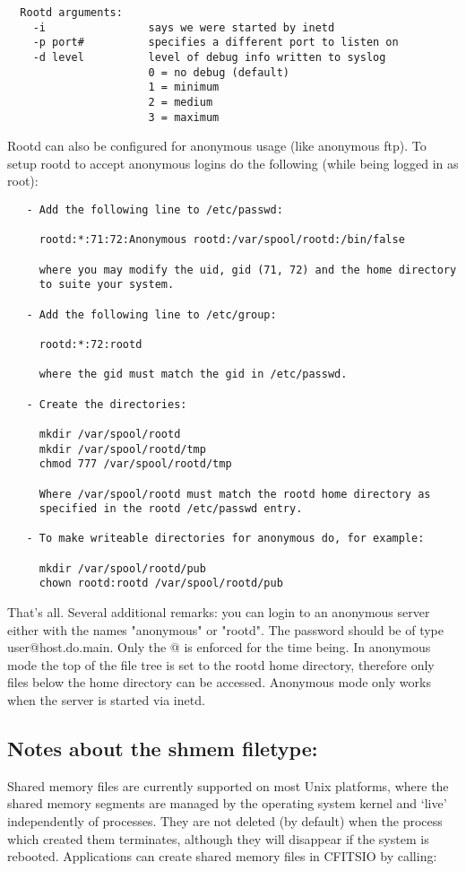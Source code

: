 \documentclass[11pt]{book}
\begin{document}
\begin{verbatim}
  Rootd arguments:
    -i                says we were started by inetd
    -p port#          specifies a different port to listen on
    -d level          level of debug info written to syslog
                      0 = no debug (default)
                      1 = minimum
                      2 = medium
                      3 = maximum
\end{verbatim}
Rootd can also be configured for anonymous usage (like anonymous ftp).
To setup rootd to accept anonymous logins do the following (while being
logged in as root):

\begin{verbatim}
   - Add the following line to /etc/passwd:

     rootd:*:71:72:Anonymous rootd:/var/spool/rootd:/bin/false

     where you may modify the uid, gid (71, 72) and the home directory
     to suite your system.

   - Add the following line to /etc/group:

     rootd:*:72:rootd

     where the gid must match the gid in /etc/passwd.

   - Create the directories:

     mkdir /var/spool/rootd
     mkdir /var/spool/rootd/tmp
     chmod 777 /var/spool/rootd/tmp

     Where /var/spool/rootd must match the rootd home directory as
     specified in the rootd /etc/passwd entry.

   - To make writeable directories for anonymous do, for example:

     mkdir /var/spool/rootd/pub
     chown rootd:rootd /var/spool/rootd/pub
\end{verbatim}
That's all.  Several additional remarks:  you can login to an anonymous
server either with the names "anonymous" or "rootd".  The password should
be of type user@host.do.main. Only the @ is enforced for the time
being.  In anonymous mode the top of the file tree is set to the rootd
home directory, therefore only files below the home directory can be
accessed.  Anonymous mode only works when the server is started via
inetd.


\subsection{Notes about the shmem filetype:}

Shared memory files are currently supported on most Unix platforms,
where the shared memory segments are managed by the operating system
kernel and `live' independently of processes. They are not deleted (by
default) when the process which created them terminates, although they
will disappear if the system is rebooted.  Applications can create
shared memory files in CFITSIO by calling:
\end{document}
